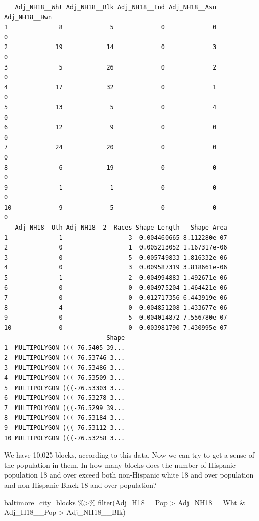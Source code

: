 \documentclass[
  letterpaper,
  DIV=11,
  numbers=noendperiod]{scrreprt}
\newenvironment{Shaded}{\begin{snugshade}}{\end{snugshade}}
\newcommand{\FunctionTok}[1]{\textcolor[rgb]{0.28,0.35,0.67}{#1}}
\newcommand{\NormalTok}[1]{\textcolor[rgb]{0.00,0.23,0.31}{#1}}
\newcommand{\SpecialCharTok}[1]{\textcolor[rgb]{0.37,0.37,0.37}{#1}}
\begin{document}
\begin{verbatim}
   Adj_NH18__Wht Adj_NH18__Blk Adj_NH18__Ind Adj_NH18__Asn Adj_NH18__Hwn
1              8             5             0             0             0
2             19            14             0             3             0
3              5            26             0             2             0
4             17            32             0             1             0
5             13             5             0             4             0
6             12             9             0             0             0
7             24            20             0             0             0
8              6            19             0             0             0
9              1             1             0             0             0
10             9             5             0             0             0
   Adj_NH18__Oth Adj_NH18__2__Races Shape_Length   Shape_Area
1              1                  3  0.004460665 8.112280e-07
2              0                  1  0.005213052 1.167317e-06
3              0                  5  0.005749833 1.816332e-06
4              0                  3  0.009587319 3.818661e-06
5              1                  2  0.004994883 1.492671e-06
6              0                  0  0.004975204 1.464421e-06
7              0                  0  0.012717356 6.443919e-06
8              4                  0  0.004851208 1.433677e-06
9              0                  5  0.004014872 7.556780e-07
10             0                  0  0.003981790 7.430995e-07
                            Shape
1  MULTIPOLYGON (((-76.5405 39...
2  MULTIPOLYGON (((-76.53746 3...
3  MULTIPOLYGON (((-76.53486 3...
4  MULTIPOLYGON (((-76.53509 3...
5  MULTIPOLYGON (((-76.53303 3...
6  MULTIPOLYGON (((-76.53278 3...
7  MULTIPOLYGON (((-76.5299 39...
8  MULTIPOLYGON (((-76.53184 3...
9  MULTIPOLYGON (((-76.53112 3...
10 MULTIPOLYGON (((-76.53258 3...
\end{verbatim}

We have 10,025 blocks, according to this data. Now we can try to get a
sense of the population in them. In how many blocks does the number of
Hispanic population 18 and over exceed both non-Hispanic white 18 and
over population and non-Hispanic Black 18 and over population?

\begin{Shaded}
\begin{Highlighting}[]
\NormalTok{baltimore\_city\_blocks }\SpecialCharTok{\%\textgreater{}\%}
  \FunctionTok{filter}\NormalTok{(Adj\_H18\_\_Pop }\SpecialCharTok{\textgreater{}}\NormalTok{ Adj\_NH18\_\_Wht }\SpecialCharTok{\&}\NormalTok{ Adj\_H18\_\_Pop }\SpecialCharTok{\textgreater{}}\NormalTok{ Adj\_NH18\_\_Blk) }
\end{Highlighting}
\end{Shaded}
\end{document}
